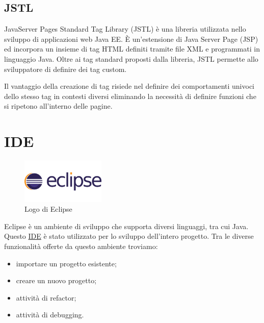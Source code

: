 \subsection{JSTL}
\noindent JavaServer Pages Standard Tag Library (JSTL) è una libreria utilizzata nello sviluppo di applicazioni web Java EE. È un'estensione di Java Server Page (JSP) ed incorpora un insieme di tag HTML definiti tramite file XML e programmati in linguaggio Java. Oltre ai tag standard proposti dalla libreria, JSTL permette allo sviluppatore di definire dei tag custom. 

\setlength{\parskip}{3ex}

\noindent Il vantaggio della creazione di tag risiede nel definire dei comportamenti univoci dello stesso tag in contesti diversi eliminando la necessità di definire funzioni che si ripetono all'interno delle pagine.

\pagebreak

\section{IDE}

\begin{figure}[!h]
	\centering
	\includegraphics[width=4cm]{../images/Eclipse-logo.png}
	\caption{Logo di Eclipse}
\end{figure}

\noindent Eclipse è un ambiente di sviluppo che supporta diversi linguaggi, tra cui Java. Questo {\hyperref[sec:ide-definition]{IDE}}\glsfirstoccur \; è stato utilizzato per lo sviluppo dell'intero progetto.
Tra le diverse funzionalità offerte da questo ambiente troviamo:
\begin{itemize}
\item importare un progetto esistente;
\item creare un nuovo progetto;
\item attività di refactor;
\item attività di debugging.
\end{itemize}